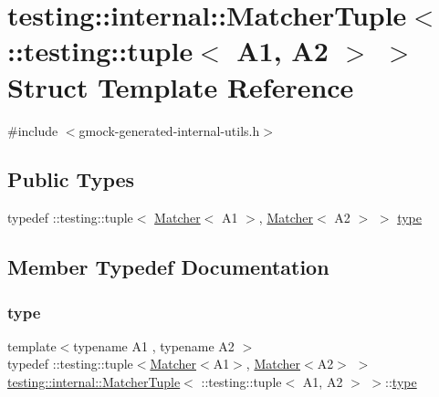 \hypertarget{structtesting_1_1internal_1_1_matcher_tuple_3_01_1_1testing_1_1tuple_3_01_a1_00_01_a2_01_4_01_4}{}\section{testing\+::internal\+::Matcher\+Tuple$<$ \+::testing\+::tuple$<$ A1, A2 $>$ $>$ Struct Template Reference}
\label{structtesting_1_1internal_1_1_matcher_tuple_3_01_1_1testing_1_1tuple_3_01_a1_00_01_a2_01_4_01_4}


{\ttfamily \#include $<$gmock-\/generated-\/internal-\/utils.\+h$>$}

\subsection*{Public Types}
\begin{DoxyCompactItemize}
\item 
typedef \+::testing\+::tuple$<$ \mbox{\hyperlink{classtesting_1_1_matcher}{Matcher}}$<$ A1 $>$, \mbox{\hyperlink{classtesting_1_1_matcher}{Matcher}}$<$ A2 $>$ $>$ \mbox{\hyperlink{structtesting_1_1internal_1_1_matcher_tuple_3_01_1_1testing_1_1tuple_3_01_a1_00_01_a2_01_4_01_4_a0ba88406203fde086f85abbf68ce2924}{type}}
\end{DoxyCompactItemize}


\subsection{Member Typedef Documentation}
\mbox{\label{structtesting_1_1internal_1_1_matcher_tuple_3_01_1_1testing_1_1tuple_3_01_a1_00_01_a2_01_4_01_4_a0ba88406203fde086f85abbf68ce2924}} 
\subsubsection{\texorpdfstring{type}{type}}
{\footnotesize\ttfamily template$<$typename A1 , typename A2 $>$ \\
typedef \+::testing\+::tuple$<$\mbox{\hyperlink{classtesting_1_1_matcher}{Matcher}}$<$A1$>$, \mbox{\hyperlink{classtesting_1_1_matcher}{Matcher}}$<$A2$>$ $>$ \mbox{\hyperlink{structtesting_1_1internal_1_1_matcher_tuple}{testing\+::internal\+::\+Matcher\+Tuple}}$<$ \+::testing\+::tuple$<$ A1, A2 $>$ $>$\+::\mbox{\hyperlink{structtesting_1_1internal_1_1_matcher_tuple_3_01_1_1testing_1_1tuple_3_01_a1_00_01_a2_01_4_01_4_a0ba88406203fde086f85abbf68ce2924}{type}}}



